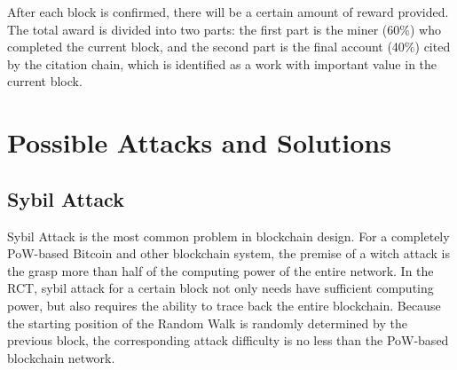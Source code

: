 \documentclass[a4paper,oneside,openany]{tufte-book}
\begin{document}
After each block is confirmed, there will be a certain amount of reward provided. The total award is divided into two parts: the first part is the miner (60\%) who completed the current block, and the second part is the final account (40\%) cited by the citation chain, which is identified as a work with important value in the current block.






















































\chapter{Possible Attacks and Solutions}


\section{Sybil Attack}

Sybil Attack is the most common problem in blockchain design. For a completely PoW-based Bitcoin and other blockchain system, the premise of a witch attack is the grasp more than half of the computing power of the entire network. In the RCT, sybil attack for a certain block not only needs have sufficient computing power, but also requires the ability to trace back the entire blockchain. Because the starting position of the Random Walk is randomly determined by the previous block, the corresponding attack difficulty is no less than the PoW-based blockchain network.
\end{document}
